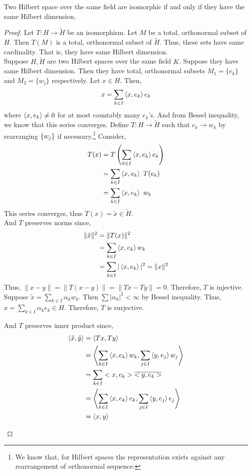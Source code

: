\begin{theorem}
	Two Hilbert space over the same field are isomorphic if and only if they have the same Hilbert dimension.
\end{theorem}
\begin{proof}
	Let $T : H \to \tilde{H}$ be an isomorphism.
	Let $M$ be a total, orthonormal subset of $H$.
	Then $T(M)$ is a total, orthonormal subset of $\tilde{H}$.
	Thus, these sets have same cardinality.
	That is, they have same Hilbert dimension. \\

	Suppose $H,\tilde{H}$ are two Hilbert spaces over the same field $K$.
	Suppose they have same Hilbert dimension.
	Then they have total, orthonormal subsets $M_1 = \{ e_k \}$ and $M_2 = \{ w_j \}$ respectively.
	Let $x \in H$.
	Then,
	\[ x = \sum_{k \in I} \left\langle x,e_k \right\rangle e_k \]
	where $\left\langle x,e_k \right\rangle \ne 0$ for at most countably many $e_k$'s.
	And from Bessel inequality, we know that this series converges.
	Define $T : H \to \tilde{H}$ such that $e_k \to w_k$ by rearranging $\left\{w_j\right\}$ if necessary.\dag\footnote{
		We know that, for Hilbert spaces the representation exists against any rearrangement of orthonormal sequence.}
	Consider,
	\begin{align*}
		T(x) 
		& = T\left( \sum_{k \in I} \left\langle x,e_k \right\rangle e_k \right) \\
		& = \sum_{k \in I} \left\langle x,e_k \right\rangle \ T(e_k) \\
		& = \sum_{k \in I} \left\langle x,e_k \right\rangle \ w_k 
	\end{align*}
	This series converges, thus $T(x) = \tilde{x} \in \tilde{H}$.\\

	And $T$ preserves norms since,
	\begin{align*}
		\|\tilde{x}\|^2
		& = \|T(x)\|^2 \\
		& = \sum_{k \in I} \left\langle x,e_k \right\rangle w_k \\
		& = \sum_{k \in I} |\left\langle x,e_k \right\rangle|^2 = \|x\|^2
	\end{align*}
	Thus, $\|x-y\| = \|T(x-y)\| = \|Tx-Ty\| = 0$.
	Therefore, $T$ is injective.\\

	Suppose $\displaystyle \tilde{x} = \sum_{k \in I} \alpha_k w_k$.
	Then $\sum |\alpha_k|^2 < \infty$ by Bessel inequality.
	Thus, $\displaystyle x = \sum_{k \in I} \alpha_k e_k \in H$.
	Therefore, $T$ is surjective.\\

	\begin{commentary}
	And $T$ preserves inner product since,
	\begin{align*}
		\left\langle \tilde{x},\tilde{y} \right\rangle 
		& = \left\langle Tx,Ty \right\rangle \\
		& = \left\langle \sum_{k \in I} \left\langle x,e_k \right\rangle w_k,\sum_{j \in I} \left\langle y,e_j \right\rangle w_j \right\rangle \\
		& = \sum_{k \in I} <x,e_k>\overline{<y,e_k>} \\
		& = \left\langle \sum_{k \in I} \left\langle x,e_k \right\rangle e_k,\sum_{j \in I} \left\langle y,e_j \right\rangle e_j \right\rangle \\
		& = \left\langle x,y \right\rangle
	\end{align*}
	\end{commentary}
\end{proof}


